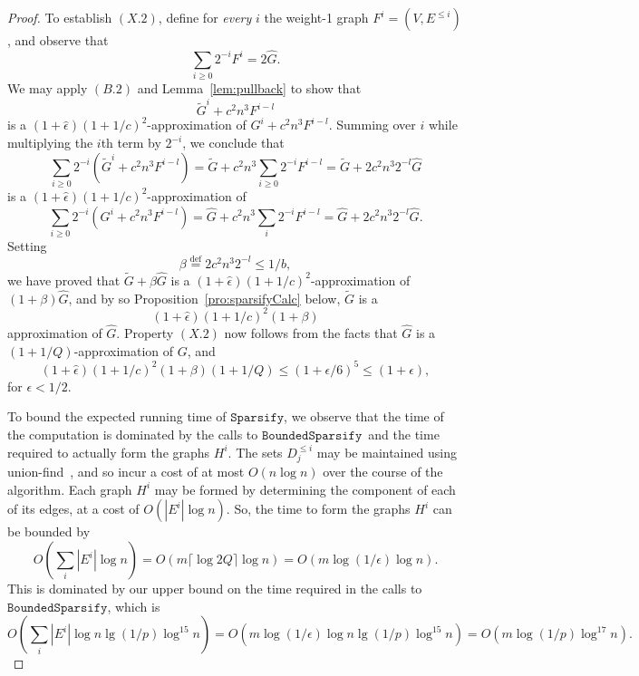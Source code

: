 \documentclass[11pt]{article}
\newcommand{\sparsify}{\ensuremath{\mathtt{Sparsify}}}
\newcommand{\boundedsparsify}{\ensuremath{\mathtt{BoundedSparsify}}}
\def\Gtil{\widetilde{G}}
\def\Ghat{\widehat{G}}
\def\epshat{\hat{\epsilon}}
\def\defeq{\stackrel{\mathrm{def}}{=}}
\def\sizeof#1{\left|#1  \right|}
\newcommand{\ceiling}[1]{\lceil#1\rceil}
\begin{document}
\begin{proof}
To establish $(X.2)$,
 define for \textit{every} $i$ the weight-1 graph
  $F^{i} = (V, E^{\leq i})$, and observe that
\[
  \sum_{i \geq 0} 2^{-i} F^{i} =  2 \Ghat.
\]
We may apply $(B.2)$ and Lemma~\ref{lem:pullback} to show that
\[
  \Gtil^{i} + c^{2} n^{3} F^{i - l}
\]
is a $(1+\epshat) (1+1/c)^{2}$-approximation of $G^{i} + c^{2} n^{3} F^{i - l}$.
Summing over $i$ while multiplying the $i$th term by $2^{-i}$, we conclude that
\[
  \sum_{i \geq 0} 2^{-i} \left(\Gtil^{i} + c^{2} n^{3} F^{i - l} \right)
=
  \Gtil + c^{2} n^{3} \sum_{i \geq 0} 2^{-i} F^{i-l}
=
  \Gtil + 2 c^{2} n^{3} 2^{-l} \Ghat
\]
is a $(1+\epshat) (1+1/c)^{2}$-approximation of
\[
 \sum_{i \geq 0} 2^{-i} \left(G^{i} + c^{2} n^{3} F^{i - l} \right)
=
\Ghat  + c^{2} n^{3} \sum_{i} 2^{-i} F^{i-l}
=
\Ghat + 2 c^{2} n^{3} 2^{-l} \Ghat.
\]
Setting
\[
  \beta \defeq 2 c^{2} n^{3} 2^{-l}  \leq  1/b,
\]
we have proved that $\Gtil + \beta  \Ghat $
is a $(1+\epshat) (1+1/c)^{2}$-approximation of
$\left(1 + \beta  \right) \Ghat$,
  and by so
  Proposition~\ref{pro:sparsifyCalc} below,
$\Gtil$
is a
\[
  (1 + \epshat) (1+1/c)^{2} (1+ \beta )
\]
approximation of $\Ghat$.
Property $(X.2)$ now follows from the facts that
   $\Ghat$ is a $(1+1/Q)$-approximation of $G$, and
\[
  (1 + \epshat) (1+1/c)^{2} (1+ \beta ) (1+1/Q)
\leq
  (1 + \epsilon /6)^{5}
\leq
  (1 + \epsilon),
\]
for $\epsilon < 1/2$.

To bound the expected running time of \sparsify,
  we observe that the time of the computation is dominated
  by the calls to \boundedsparsify \ and the time
  required to actually form the graphs $H^{i}$.
The sets $D_{j}^{\leq i}$ may be maintained using
  union-find~\cite{Tarjan}, and so incur a cost of at most $O (n \log n)$
  over the course of the algorithm.
Each graph $H^{i}$ may be formed by determining the component
  of each of its edges, at a cost of $O (\sizeof{E^{i}} \log n)$.
So, the time to form the graphs $H^{i}$ can be bounded by
\[
  O (\sum_{i} \sizeof{E^{i}} \log n) =
  O (m \ceiling{\log 2 Q} \log n)
  = O (m \log (1/\epsilon) \log n).
\]
This is dominated by our upper bound on
  the time required in the calls to \boundedsparsify,
  which is
\[
  O \left(\sum_{i} \sizeof{E^{i}} \log n \lg (1/p) \log^{15} n \right)
=
  O \left(m \log (1/\epsilon ) \log n \lg (1/p) \log^{15} n \right)
=
  O \left(m \log (1/p) \log^{17} n \right).
\]
\end{proof}
\end{document}
